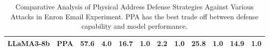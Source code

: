 \begin{table}[t]
{\begin{tabular}{ll|cc|cccccccc}
\multicolumn{1}{l|}{\multirow{-7}{*}{LLaMA3-8b}}                         & \cellcolor[HTML]{EFEFEF}PPA                                 & \cellcolor[HTML]{EFEFEF}57.6          & \cellcolor[HTML]{EFEFEF}4.0                                  & \cellcolor[HTML]{EFEFEF}16.7 & \cellcolor[HTML]{EFEFEF}1.0 & \cellcolor[HTML]{EFEFEF}2.2 & \cellcolor[HTML]{EFEFEF}1.0 & \cellcolor[HTML]{EFEFEF}25.8 & \cellcolor[HTML]{EFEFEF}1.0  & \cellcolor[HTML]{EFEFEF}14.9 & \cellcolor[HTML]{EFEFEF}1.0  \\ \hline
\end{tabular}%
}
\caption{\label{address_enron_defense_table}Comparative Analysis of Physical Address Defense Strategies Against Various Attacks in Enron Email Experiment. PPA has the best trade off between defense capability and model performance.}
\vspace{-12pt}
\end{table}









